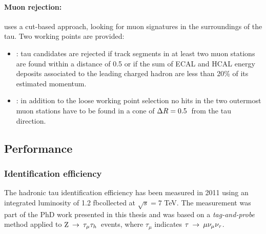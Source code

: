 \paragraph{Muon rejection:} uses a cut-based approach, looking for muon signatures in the surroundings of the tau. Two working points are provided:

\begin{itemize}
\item {}: tau candidates are rejected if track segments in at least two muon stations are found within a \DR distance of 0.5 or if the sum of ECAL and HCAL energy deposits associated to the leading charged hadron are less than 20\% of its estimated momentum.
\item {}: in addition to the loose working point selection no hits in the two outermost muon stations have to be found in a cone of $\Delta R = 0.5$\ from the tau direction.
\end{itemize}

\subsection{Performance}

\subsubsection{Identification efficiency}
The hadronic tau identification efficiency has been measured in 2011 using an integrated luminosity of 1.2 fb\Inv collected at $\sqrt{s}=7$ TeV. 
The measurement was part of the PhD work presented in this thesis and was based on a \emph{tag-and-probe} method applied to $\mathrm{Z}\:\rightarrow\:\tau_\mu\tau_h$\ events, where $\tau_\mu$ indicates $\tau\:\rightarrow\:\mu\nu_\mu\nu_\tau$. 

